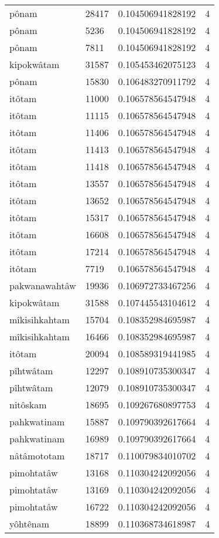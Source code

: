 \begin{longtable}{llll}
pônam & 28417 & 0.104506941828192 & 4 \\
pônam & 5236 & 0.104506941828192 & 4 \\
pônam & 7811 & 0.104506941828192 & 4 \\
kipokwâtam & 31587 & 0.105453462075123 & 4 \\
pônam & 15830 & 0.106483270911792 & 4 \\
itôtam & 11000 & 0.106578564547948 & 4 \\
itôtam & 11115 & 0.106578564547948 & 4 \\
itôtam & 11406 & 0.106578564547948 & 4 \\
itôtam & 11413 & 0.106578564547948 & 4 \\
itôtam & 11418 & 0.106578564547948 & 4 \\
itôtam & 13557 & 0.106578564547948 & 4 \\
itôtam & 13652 & 0.106578564547948 & 4 \\
itôtam & 15317 & 0.106578564547948 & 4 \\
itôtam & 16608 & 0.106578564547948 & 4 \\
itôtam & 17214 & 0.106578564547948 & 4 \\
itôtam & 7719 & 0.106578564547948 & 4 \\
pakwanawahtâw & 19936 & 0.106972733467256 & 4 \\
kipokwâtam & 31588 & 0.107445543104612 & 4 \\
mîkisihkahtam & 15704 & 0.108352984695987 & 4 \\
mîkisihkahtam & 16466 & 0.108352984695987 & 4 \\
itôtam & 20094 & 0.108589319441985 & 4 \\
pîhtwâtam & 12297 & 0.108910735300347 & 4 \\
pîhtwâtam & 12079 & 0.108910735300347 & 4 \\
nitôskam & 18695 & 0.109267680897753 & 4 \\
pahkwatinam & 15887 & 0.109790392617664 & 4 \\
pahkwatinam & 16989 & 0.109790392617664 & 4 \\
nâtâmototam & 18717 & 0.110079834010702 & 4 \\
pimohtatâw & 13168 & 0.110304242092056 & 4 \\
pimohtatâw & 13169 & 0.110304242092056 & 4 \\
pimohtatâw & 16722 & 0.110304242092056 & 4 \\
yôhtênam & 18899 & 0.110368734618987 & 4 \\

\end{longtable}
